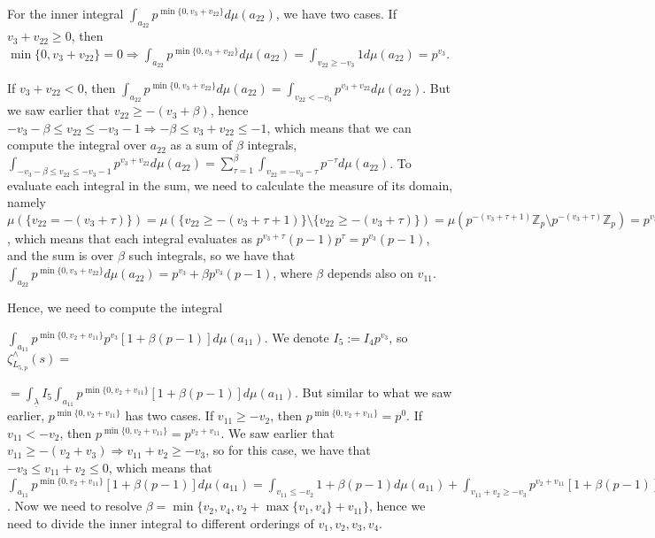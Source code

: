 \documentclass{article}
\begin{document}
For the inner integral $\displaystyle\int_{a_{22}}p^{\min\{0,v_{3}+v_{22}\}}d\mu(a_{22})$, we have two cases. If $v_{3}+v_{22}\geq{0}$, then $\min\{0,v_{3}+v_{22}\}=0\Rightarrow{\displaystyle\int_{a_{22}}p^{\min\{0,v_{3}+v_{22}\}}d\mu(a_{22})}=\displaystyle\int_{v_{22}\geq{-v_{3}}}1d\mu(a_{22})=p^{v_{3}}$. 

If $v_{3}+v_{22}<0$, then $\displaystyle\int_{a_{22}}p^{\min\{0,v_{3}+v_{22}\}}d\mu(a_{22})=\displaystyle\int_{v_{22}<-v_{3}}p^{v_{3}+v_{22}}d\mu(a_{22})$. But we saw earlier that $v_{22}\geq{-(v_{3}+\beta)}$, hence $-v_{3}-\beta\leq{v_{22}}\leq{-v_{3}-1}\Rightarrow{-\beta\leq{v_{3}+v_{22}}\leq{-1}}$, which means that we can compute the integral over $a_{22}$ as a sum of $\beta$ integrals, $\displaystyle\int_{-v_{3}-\beta\leq{v_{22}}\leq{-v_{3}-1}}p^{v_{3}+v_{22}}d\mu(a_{22})=\sum_{\tau=1}^{\beta}\displaystyle\int_{v_{22}=-v_{3}-\tau}p^{-\tau}d\mu(a_{22})$. To evaluate each integral in the sum, we need to calculate the measure of its domain, namely $\mu(\{v_{22}=-(v_{3}+\tau)\})=\mu(\{v_{22}\geq{-(v_{3}+\tau+1)}\}\setminus{\{v_{22}\geq{-(v_{3}+\tau)}\}})=\mu(p^{-(v_{3}+\tau+1)}\mathbb{Z}_{p}\setminus{p^{-(v_{3}+\tau)}\mathbb{Z}_{p}})=p^{v_{3}+\tau+1}-p^{v_{3}+\tau}=p^{v_{3}+\tau}(p-1)$, which means that each integral evaluates as $p^{v_{3}+\tau}(p-1)p^{\tau}=p^{v_{3}}(p-1)$, and the sum is over $\beta$ such integrals, so we have that $\displaystyle\int_{a_{22}}p^{\min\{0,v_{3}+v_{22}\}}d\mu(a_{22})=p^{v_{3}}+\beta{p^{v_{3}}(p-1)}$, where $\beta$ depends also on $v_{11}$.

Hence, we need to compute the integral 

$\displaystyle\int_{a_{11}}p^{\min\{0,v_{2}+v_{11}\}}p^{v_{3}}[1+\beta(p-1)]d\mu(a_{11})$. We denote $I_{5}:=I_{4}p^{v_{3}}$, so $\zeta_{L_{5,p}}^{\wedge}(s)=$

$=\displaystyle\int_{\underline\lambda}I_{5}\displaystyle\int_{a_{11}}p^{\min\{0,v_{2}+v_{11}\}}[1+\beta(p-1)]d\mu(a_{11})$. But similar to what we saw earlier, $p^{\min\{0,v_{2}+v_{11}\}}$ has two cases. If $v_{11}\geq{-v_{2}}$, then $p^{\min\{0,v_{2}+v_{11}\}}=p^{0}$. If $v_{11}<-v_{2}$, then $p^{\min\{0,v_{2}+v_{11}\}}=p^{v_{2}+v_{11}}$.
We saw earlier that $v_{11}\geq{-(v_{2}+v_{3})}\Rightarrow{v_{11}+v_{2}\geq{-v_{3}}}$, so for this case, we have that $-v_{3}\leq{v_{11}+v_{2}}\leq{0}$, which means that $\displaystyle\int_{a_{11}}p^{\min\{0,v_{2}+v_{11}\}}[1+\beta(p-1)]d\mu(a_{11})=\displaystyle\int_{v_{11}\leq{-v_{2}}}1+\beta(p-1)d\mu(a_{11})+\displaystyle\int_{v_{11}+v_{2}\geq{-v_{3}}}p^{v_{2}+v_{11}}[1+\beta(p-1)]d\mu(a_{11})=\displaystyle\int_{v_{11}\leq{-v_{2}}}1+\beta(p-1)d\mu(a_{11})+\sum_{\tau=1}^{v_{3}}\displaystyle\int_{v_{11}\geq{-(v_{3}+v_{2})}}p^{-\tau}[1+\beta(p-1)]d\mu(a_{11})$. Now we need to resolve $\beta=\min\{v_{2},v_{4},v_{2}+\max\{v_{1},v_{4}\}+v_{11}\}$, hence we need to divide the inner integral to different orderings of $v_{1},v_{2},v_{3},v_{4}$.
\end{document}
